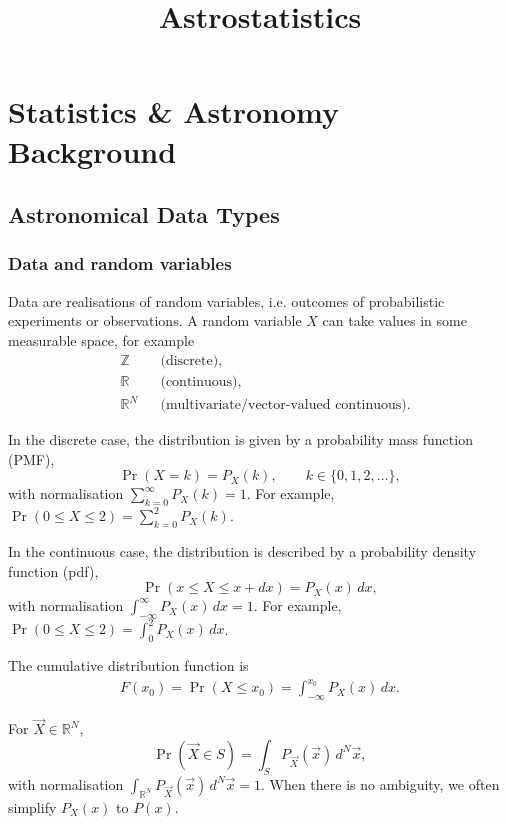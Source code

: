 \documentclass[11pt, titlepage]{article} %
\title{Astrostatistics}
\date{ }
\numberwithin{equation}{section}
\theoremstyle{definition}
\numberwithin{assumption}{section}
\begin{document}
\maketitle
\tableofcontents
\newpage

\section{Statistics \& Astronomy Background}
\subsection{Astronomical Data Types}

\subsubsection*{Data and random variables}

Data are realisations of random variables, i.e. outcomes of probabilistic experiments or observations. A random variable $X$ can take values in some measurable space, for example
\begin{align*}
    &\mathbb{Z} && \text{(discrete)},\\
    &\mathbb{R} && \text{(continuous)},\\
    &\mathbb{R}^N && \text{(multivariate/vector-valued continuous)}.
\end{align*}

In the discrete case, the distribution is given by a probability mass function (PMF),
\begin{equation*}
    \Pr(X=k)=P_X(k), \qquad k\in \{0,1,2,\dots\},
\end{equation*}
with normalisation $\sum_{k=0}^\infty P_X(k)=1$. For example, $\Pr(0\le X\le 2)=\sum_{k=0}^2 P_X(k)$.

In the continuous case, the distribution is described by a probability density function (pdf),
\begin{equation*}
    \Pr(x\le X\le x+dx)=P_X(x)\,dx,
\end{equation*}
with normalisation $\int_{-\infty}^{\infty}P_X(x)\,dx=1$. For example, $\Pr(0\le X\le 2)=\int_0^2P_X(x)\,dx$.

The cumulative distribution function is
\begin{align*}
    F(x_0)=\Pr(X\le x_0)=\int_{-\infty}^{x_0}P_X(x)\,dx.
\end{align*}

For $\vec X\in \mathbb{R}^N$,
\begin{equation*}
    \Pr(\vec X\in S)=\int_S P_{\vec X}(\vec x)\,d^N\vec x,
\end{equation*}
with normalisation $\int_{\mathbb{R}^N}P_{\vec X}(\vec x)\,d^N\vec x=1$. When there is no ambiguity, we often simplify $P_X(x)$ to $P(x)$.
\end{document}
